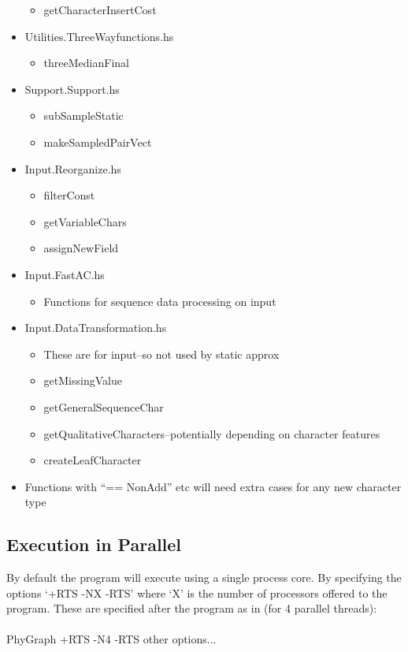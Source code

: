 \documentclass[11pt]{article}
\begin{document}
\begin{itemize}
				\begin{itemize}
					\item{getCharacterInsertCost}
				\end{itemize}
			 \item{Utilities.ThreeWayfunctions.hs}
				\begin{itemize}
					\item{threeMedianFinal}
				\end{itemize}
			 \item{Support.Support.hs}
				\begin{itemize}
					\item{subSampleStatic}
					\item{makeSampledPairVect}
				\end{itemize}
			 \item{Input.Reorganize.hs}
			 \begin{itemize}
			 	\item{filterConst}
			 	\item{getVariableChars}
			 	\item{assignNewField}
			 \end{itemize}
		 	  \item{Input.FastAC.hs}
		 	 \begin{itemize}
		 	 	\item{Functions for sequence data processing on input}
		 	 \end{itemize}
		 	 \item{Input.DataTransformation.hs}
		 	 \begin{itemize}
		 	 	\item{These are for input--so not used by static approx}
		 	 	\item{getMissingValue}
		 	 	\item{getGeneralSequenceChar}
		 	 	\item{getQualitativeCharacters--potentially depending on character features}
		 	 	\item{createLeafCharacter}
		 	 \end{itemize}
		 	 
			 \item{Functions with ``== NonAdd'' etc will need extra cases for any new character type}
	\end{itemize}
	\subsection{Execution in Parallel}
	By default the program will execute using a single process core.  By specifying the options `+RTS -NX -RTS' where `X' is the number of processors offered to the program. These are specified after the program as in (for 4 parallel threads):\\
	\\
	PhyGraph +RTS -N4 -RTS other options...  \\
	
\end{document}

